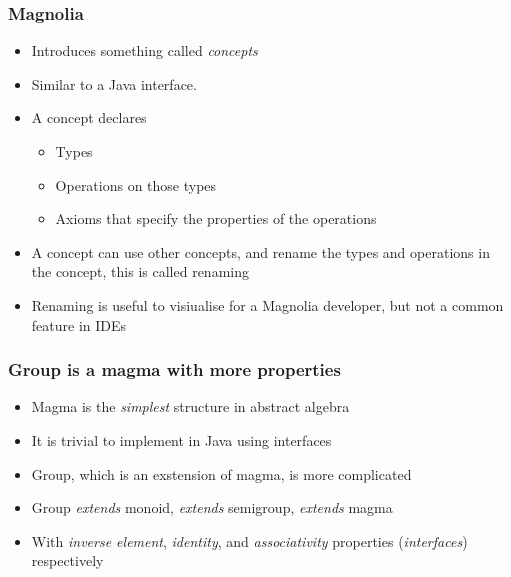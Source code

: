 \begin{frame}
  \frametitle{Magnolia}
  \begin{itemize}
    \item Introduces something called \textit{concepts}
    \item Similar to a Java interface.
      \pause
    \item A concept declares
      \begin{itemize}
        \item Types
        \item Operations on those types
        \item Axioms that specify the properties of the operations
      \end{itemize}
      \pause
    \item A concept can use other concepts, and rename the types and operations
      in the concept, this is called renaming
      \pause
    \item Renaming is useful to visiualise for a Magnolia developer, but not a
    common feature in IDEs
  \end{itemize}
\end{frame}

\begin{frame}
  \frametitle{Group is a magma with more properties}
  \begin{itemize}
    \item Magma is the \textit{simplest} structure in abstract algebra
    \item It is trivial to implement in Java using interfaces
    \item Group, which is an exstension of magma, is more complicated
    \item Group \textit{extends} monoid, \textit{extends} semigroup,
      \textit{extends} magma
    \item With \textit{inverse element}, \textit{identity}, and
      \textit{associativity} properties (\textit{interfaces}) respectively
  \end{itemize}
\end{frame}

